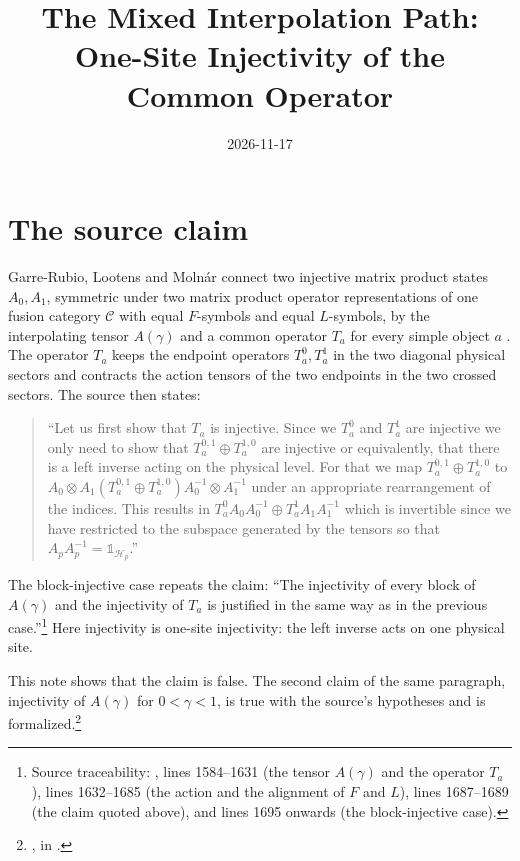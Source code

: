 \documentclass{article}
\title{The Mixed Interpolation Path: One-Site Injectivity of the Common Operator}
\author{}
\date{2026-11-17}
\begin{document}
\maketitle
{}

\section{The source claim}
Garre-Rubio, Lootens and Moln\'ar connect two injective matrix product
states $A_0,A_1$, symmetric under two matrix product operator
representations of one fusion category $\mathcal C$ with equal $F$-symbols
and equal $L$-symbols, by the interpolating tensor $A(\gamma)$ and a common
operator $T_a$ for every simple object $a$
\cite[Section~5]{GarreRubio2023MPOSym}. The operator $T_a$ keeps the endpoint
operators $T^0_a,T^1_a$ in the two diagonal physical sectors and contracts
the action tensors of the two endpoints in the two crossed sectors. The
source then states:
\begin{quote}
    ``Let us first show that $T_a$ is injective. Since we $T_a^0$ and
    $T_a^1$ are injective we only need to show that
    $T_a^{0,1} \oplus T_a^{1,0}$ are injective or equivalently, that there
    is a left inverse acting on the physical level. For that we map
    $T_a^{0,1} \oplus T_a^{1,0}$ to
    $A_0\otimes A_1( T_a^{0,1} \oplus T_a^{1,0})
        A_0^{-1}\otimes A_1^{-1}$
    under an appropriate rearrangement of the indices. This results in
    $T_a^{0} A_0A_0^{-1} \oplus T_a^{1} A_1A_1^{-1}$ which is
    invertible since we have restricted to the subspace generated by the
    tensors so that $A_pA_p^{-1}= \mathbb 1_{\mathcal{H}_p}$.''
\end{quote}
The block-injective case repeats the claim: ``The injectivity of every block
of $A(\gamma)$ and the injectivity of $T_a$ is justified in the same way as
in the previous case.''\footnote{Source traceability:
    , lines 1584--1631 (the tensor
    $A(\gamma)$ and the operator $T_a$), lines 1632--1685 (the action and
    the alignment of $F$ and $L$), lines 1687--1689 (the claim quoted
    above), and lines 1695 onwards (the block-injective case).}
Here injectivity is one-site injectivity: the left inverse acts on one
physical site.

This note shows that the claim is false. The second claim of the same
paragraph, injectivity of $A(\gamma)$ for $0<\gamma<1$, is true with the
source's hypotheses and is formalized.\footnote{%
    ,
    in .}
\end{document}

